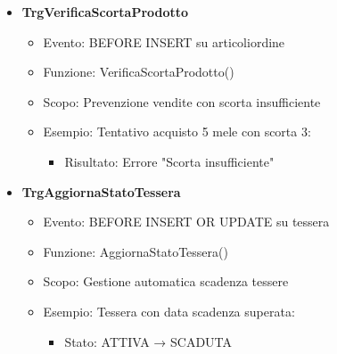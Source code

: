 \documentclass[a4paper,12pt]{article}
\begin{document}
\begin{tcolorbox}[enhanced,breakable,colback=mygray,colframe=myblue,title=Panoramica Trigger]
\begin{itemize}
    \item \textbf{TrgVerificaScortaProdotto}
        \begin{itemize}
            \item Evento: BEFORE INSERT su articoliordine
            \item Funzione: VerificaScortaProdotto()
            \item Scopo: Prevenzione vendite con scorta insufficiente
            \item Esempio: Tentativo acquisto 5 mele con scorta 3:
                \begin{itemize}
                    \item Risultato: Errore "Scorta insufficiente"
                \end{itemize}
        \end{itemize}
        
    \item \textbf{TrgAggiornaStatoTessera}
        \begin{itemize}
            \item Evento: BEFORE INSERT OR UPDATE su tessera
            \item Funzione: AggiornaStatoTessera()
            \item Scopo: Gestione automatica scadenza tessere
            \item Esempio: Tessera con data scadenza superata:
                \begin{itemize}
                    \item Stato: ATTIVA → SCADUTA
                \end{itemize}
        \end{itemize}
\end{itemize}
\end{tcolorbox}
\end{document}
